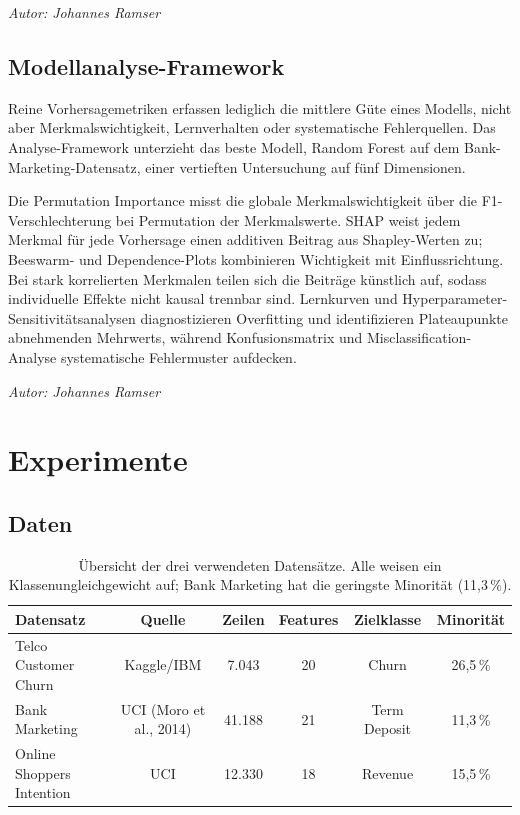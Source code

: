 \documentclass[10pt]{scrartcl}
\begin{document}
\begin{flushright}\textit{Autor: Johannes Ramser}\end{flushright}

\subsection{Modellanalyse-Framework}
\label{sec:model-analysis}

Reine Vorhersagemetriken erfassen lediglich die mittlere Güte eines Modells, nicht aber Merkmalswichtigkeit, Lernverhalten oder systematische Fehlerquellen. Das Analyse-Framework unterzieht das beste Modell, Random Forest auf dem Bank-Marketing-Datensatz, einer vertieften Untersuchung auf fünf Dimensionen.

Die Permutation Importance \cite{Breiman2001} misst die globale Merkmalswichtigkeit über die F1-Verschlechterung bei Permutation der Merkmalswerte. SHAP \cite{Lundberg2017} weist jedem Merkmal für jede Vorhersage einen additiven Beitrag aus Shapley-Werten zu; Beeswarm- und Dependence-Plots kombinieren Wichtigkeit mit Einflussrichtung. Bei stark korrelierten Merkmalen teilen sich die Beiträge künstlich auf, sodass individuelle Effekte nicht kausal trennbar sind. Lernkurven und Hyperparameter-Sensitivitätsanalysen diagnostizieren Overfitting und identifizieren Plateaupunkte abnehmenden Mehrwerts, während Konfusionsmatrix und Misclassification-Analyse systematische Fehlermuster aufdecken.

\begin{flushright}\textit{Autor: Johannes Ramser}\end{flushright}

\section{Experimente}
\subsection{Daten}
\label{sec:data}

\begin{table}[ht]
\centering
\footnotesize
\setlength{\tabcolsep}{3pt}
\caption{Übersicht der drei verwendeten Datensätze. Alle weisen ein Klassenungleichgewicht auf; Bank Marketing hat die geringste Minorität (11,3\,\%).}
\label{tab:datasets}
\begin{tabular}{lccccc}
\hline
Datensatz & Quelle & Zeilen & Features & Zielklasse & Minorität \\
\hline
Telco Customer Churn & Kaggle/IBM & 7.043 & 20 & Churn & 26,5\,\% \\
Bank Marketing & UCI (Moro et al., 2014) & 41.188 & 21 & Term Deposit & 11,3\,\% \\
Online Shoppers Intention & UCI & 12.330 & 18 & Revenue & 15,5\,\% \\
\hline
\end{tabular}
\end{table}
\end{document}
